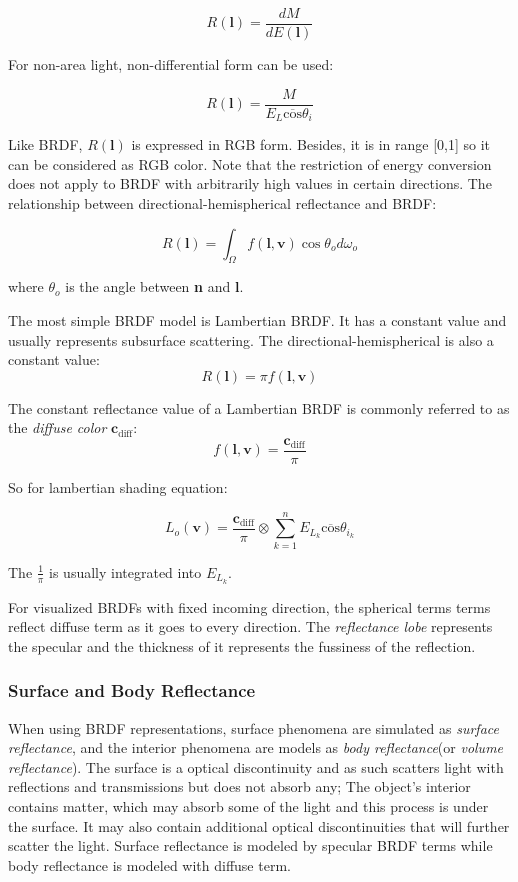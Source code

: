 \documentclass[10pt, a4paper]{article}
\begin{document}
            $$R(\textbf{l}) = \frac{dM}{dE(\textbf{l})}$$

            For non-area light, non-differential form can be used:

            $$R(\textbf{l}) = \frac{M}{E_L\overline{\text{cos}}\theta_i}$$

            Like BRDF, $R(\textbf{l})$ is expressed in RGB form. Besides, it is in range [0,1] so it can be considered as RGB color. Note that the restriction of energy conversion does not apply to BRDF with arbitrarily high values in certain directions. The relationship between directional-hemispherical reflectance and BRDF: 

            $$R(\textbf{l}) = \int_{\Omega}f(\textbf{l}, \textbf{v})\cos{\theta_o}d\omega_o$$

            where $\theta_o$ is the angle between \textbf{n} and \textbf{l}.

            The most simple BRDF model is Lambertian BRDF. It has a constant value and usually represents subsurface scattering. The directional-hemispherical is also a constant value:
            $$R(\textbf{l}) = \pi f(\textbf{l}, \textbf{v})$$
            
            The constant reflectance value of a Lambertian BRDF is commonly referred to as the \emph{diffuse color} $\textbf{c}_{\text{diff}}$: 
            $$f(\textbf{l}, \textbf{v}) = \frac{\textbf{c}_{\text{diff}}}{\pi}$$
            
            So for lambertian shading equation: 

            $$L_o(\textbf{v}) = \frac{\textbf{c}_{\text{diff}}}{\pi} \otimes \sum_{k = 1}^{n} E_{L_k}\overline{\text{cos}}\theta_{i_k}$$

            The $\frac{1}{\pi}$ is usually integrated into $E_{L_k}$.

            For visualized BRDFs with fixed incoming direction, the spherical terms terms reflect diffuse term as it goes to every direction. The \emph{reflectance lobe} represents the specular and the thickness of it represents the fussiness of the reflection. 

        \subsubsection{Surface and Body Reflectance}
            When using BRDF representations, surface phenomena are simulated as \emph{surface reflectance}, and the interior phenomena are models as \emph{body reflectance}(or \emph{volume reflectance}). The surface is a optical discontinuity and as such scatters light with reflections and transmissions but does not absorb any; The object's interior contains matter, which may absorb some of the light and this process is under the surface. It may also contain additional optical discontinuities that will further scatter the light. Surface reflectance is modeled by specular BRDF terms while body reflectance is modeled with diffuse term. 
\end{document}
